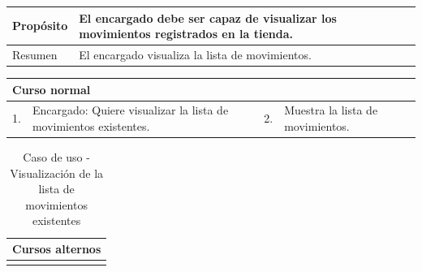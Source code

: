 \begin{table}[H]
	\centering
	\begin{tabular}{| m{} | m{} | m{} | m{} |}
		\hline
		Propósito & \multicolumn{3}{m{0.67\textwidth}|}{El encargado debe ser capaz de visualizar los movimientos registrados en la tienda.}  \\ 
		\hline
		Resumen & \multicolumn{3}{m{0.67\textwidth}|}{El encargado visualiza la lista de movimientos.} \\ 
		\hline
	\end{tabular}
\end{table}


\begin{table}[H]
	\centering
	\begin{tabular}{| m{} | m{} | m{} | m{} |}
		\hline
		\multicolumn{4}{|m{0.9\textwidth}|}{Curso normal}     \\ 
		\hline
		1. & Encargado: Quiere visualizar la lista de movimientos existentes. & 2. &  Muestra la lista de movimientos.  \\ 
		\hline
	\end{tabular}
\end{table}

\begin{table}[H]
	\centering
	\begin{tabular}{| m{} | m{} | m{} | m{} |}
		\hline
		\multicolumn{4}{|m{0.9\textwidth}|}{Cursos alternos}     \\ 
		\hline
		& \multicolumn{3}{m{0.67\textwidth}|}{} \\ 
		\hline
	\end{tabular}
	\caption{Caso de uso - Visualización de la lista de movimientos existentes}
\end{table}

\newpage


